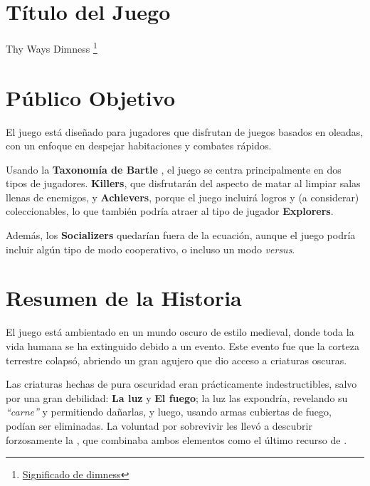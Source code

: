 \begin{multicols}{2}

    \section{Título del Juego}
    Thy Ways Dimness \footnote{\href{https://dictionary.cambridge.org/es/diccionario/ingles/dimness}{Significado de dimness}}


    \section{Público Objetivo}
    El juego está diseñado para jugadores que disfrutan de juegos basados en oleadas, con un enfoque en despejar habitaciones y combates rápidos.

    Usando la \textbf{Taxonomía de Bartle} \cite{bartle1996}, el juego se centra principalmente en dos tipos de jugadores. \textbf{Killers}, que disfrutarán del aspecto de matar al limpiar salas llenas de enemigos, y \textbf{Achievers}, porque el juego incluirá logros y (a considerar) coleccionables, lo que también podría atraer al tipo de jugador \textbf{Explorers}.

    Además, los \textbf{Socializers} quedarían fuera de la ecuación, aunque el juego podría incluir algún tipo de modo cooperativo, o incluso un modo \textit{versus}.


    \section{Resumen de la Historia} \label{sec:story}
    El juego está ambientado en un mundo oscuro de estilo medieval, donde toda la vida humana se ha extinguido debido a un evento. Este evento fue que la corteza terrestre colapsó, abriendo un gran agujero que dio acceso a criaturas oscuras.

    Las criaturas hechas de pura oscuridad eran prácticamente indestructibles, salvo por una gran debilidad: \textbf{La luz} y \textbf{El fuego}; la luz las expondría, revelando su \textit{“carne”} y permitiendo dañarlas, y luego, usando armas cubiertas de fuego, podían ser eliminadas. La voluntad por sobrevivir les llevó a descubrir forzosamente la \gunpowder, que combinaba ambos elementos como el último recurso de \humanity.


\end{multicols}
